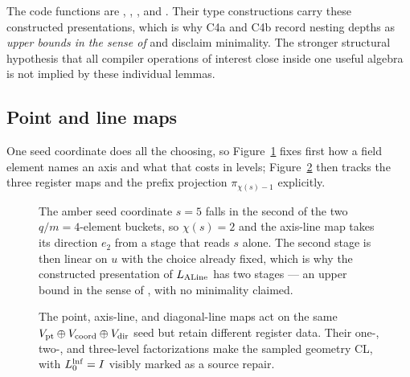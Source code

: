The code functions are , ,
, and .  Their type constructions carry these
constructed presentations, which is why C4a and C4b record nesting depths as
\emph{upper bounds in the sense of}  and disclaim
minimality.  The stronger structural hypothesis that all compiler operations
of interest close inside one useful algebra is not implied by these individual
lemmas.

\subsection{Point and line maps}

One seed coordinate does all the choosing, so Figure~\ref{fig:chi-axis-buckets}
fixes first how a field element names an axis and what that costs in levels;
Figure~\ref{fig:point-line-maps} then tracks the three register maps and the
prefix projection \(\pi_{\chi(s)-1}\) explicitly.
\begin{figure}[H]
\centering

\caption{The amber seed coordinate \(s=5\) falls in the second of the two \(q/m=4\)-element buckets, so \(\chi(s)=2\) and the axis-line map takes its direction \(e_2\) from a stage that reads \(s\) alone.  The second stage is then linear on \(u\) with the choice already fixed, which is why the constructed presentation of \(L_{\rm ALine}\) has two stages --- an upper bound in the sense of , with no minimality claimed.}
\label{fig:chi-axis-buckets}
\end{figure}
\begin{figure}[H]
\centering

\caption{The point, axis-line, and diagonal-line maps act on the same \(V_{\rm pt}\oplus V_{\rm coord}\oplus V_{\rm dir}\) seed but retain different register data.  Their one-, two-, and three-level factorizations make the sampled geometry CL, with \(L^{\rm lnf}_0=I\) visibly marked as a source repair.}
\label{fig:point-line-maps}
\end{figure}

